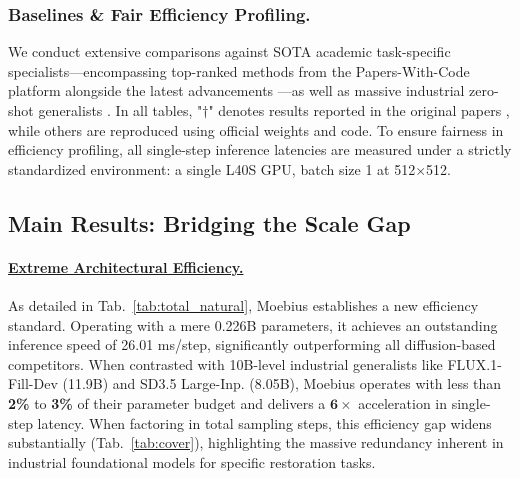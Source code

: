 \documentclass{llmxive}
\begin{document}
\subsubsection{Baselines \& Fair Efficiency Profiling.} 
We conduct extensive comparisons against SOTA academic task-specific specialists—encompassing top-ranked methods from the Papers-With-Code platform\cite{paperwithcode} alongside the latest advancements \cite{xu2025pixelhacker, Li2025RoRem, Chen2024LCI, manukyan2023hdpainter}—as well as massive industrial zero-shot generalists \cite{flux2024, esser2024SD3}. In all tables, "$\dag$" denotes results reported in the original papers \cite{xu2025pixelhacker, li2022mat, Sargsyan2023migan, zhuang2023powerpaint}, while others are reproduced using official weights and code. To ensure fairness in efficiency profiling, all single-step inference latencies are measured under a strictly standardized environment: a single L40S GPU, batch size 1 at 512$\times$512.

\vspace{-0.5em}
\subsection{Main Results: Bridging the Scale Gap}\label{subsec:main_results}

\vspace{-0.5em}
\paragraph{\underline{Extreme Architectural Efficiency.}}
As detailed in Tab.~\ref{tab:total_natural}, Moebius establishes a new efficiency standard. Operating with a mere 0.226B parameters, it achieves an outstanding inference speed of 26.01 ms/step, significantly outperforming all diffusion-based competitors. When contrasted with 10B-level industrial generalists like FLUX.1-Fill-Dev (11.9B) and SD3.5 Large-Inp. (8.05B), Moebius operates with less than \textbf{2\%} to \textbf{3\%} of their parameter budget and delivers a $\boldsymbol{6\times}$ acceleration in single-step latency. When factoring in total sampling steps, this efficiency gap widens substantially (Tab.~\ref{tab:cover}), highlighting the massive redundancy inherent in industrial foundational models for specific restoration tasks.
\end{document}
